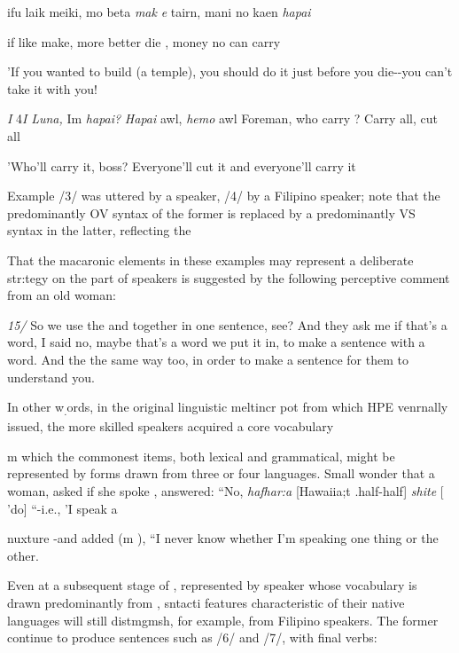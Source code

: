 \ea\label{ex:3}
 ifu laik meiki, mo beta \textit{mak} \textit{e} tairn, mani no kaen \textit{hapai}
\glt
\z

if like make, more better die , money no can carry

'If you wanted to build (a temple), you should do it just before you die-{}-you can't take it with you!

\textit{I} 4\textit{I }\textit{Luna,} Im \textit{hapai?} \textit{Hapai} awl, \textit{hemo} awl Foreman, who carry ? Carry all, cut all

'Who'll carry it, boss? Everyone'll cut it and everyone'll carry it

Example /3/ was uttered by a  speaker, /4/ by a Filipino speaker; note that the predominantly OV syntax of the former is replaced by a predominantly VS syntax in the latter, reflecting the

That the macaronic elements in these examples may represent a deliber\-ate str:tegy on the part of speakers is suggested by the following perceptive comment from an old  woman:

\textit{15/} So we use the  and  together in one sentence, see? And they ask me if that's a  word, I said no, maybe that's a  word we put it in, to make a sentence with a  word. And the  the same way too, in order to make a sentence for them to understand you.

In other w\textsubscript{.}ords, in the original linguistic meltincr pot from which HPE venrnally issued, the more skilled speakers acquired a core vocabulary

m which the commonest items, both lexical and grammatical, might be represented by forms drawn from three or four languages. Small won\-der that a  woman, asked if she spoke  , answered: ``No, \textit{haf{\textquotedbl}{\textquotedbl}har:a} [Hawaiia;t .half-half] \textit{shite} [ 'do] ``{}-i.e., 'I speak a

nuxture {}-and added (m ), ``I never know whether I'm speaking one thing or the other.{\textquotedbl}

Even at a subsequent stage of , represented by speaker whose vocabulary is drawn predominantly from , sntacti features characteristic of their native languages will still distmgmsh, for example,  from Filipino speakers. The former continue to produce sentences such as /6/ and /7/, with final verbs:

